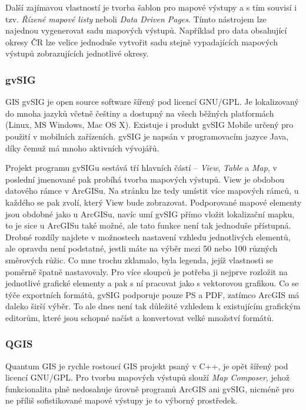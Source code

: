 \documentclass[a4paper,12pt,draft]{article}
\begin{document}
Další zajímavou vlastností je tvorba šablon pro mapové výstupy a s tím souvisí i tzv. \emph{Řízené mapové listy} neboli \emph{Data Driven Pages}. Tímto nástrojem lze najednou vygenerovat sadu mapových výstupů. Například pro data obsahující okresy ČR lze velice jednoduše vytvořit sadu stejně vypadajících mapových výstupů zobrazujících jednotlivé okresy.


\subsubsection{gvSIG}
GIS gvSIG je open source software šířený pod licencí GNU/GPL. Je lokalizovaný do mnoha jazyků včetně češtiny a dostupný na všech běžných platformách (Linux, MS Windows, Mac OS X). Existuje i produkt gvSIG Mobile určený pro použití v mobilních zařízeních. gvSIG je napsán v programovacím jazyce Java, díky čemuž má mnoho aktivních vývojářů.

Projekt programu gvSIGu sestává tří hlavních částí -- \emph{View}, \emph{Table} a \emph{Map}, v poslední jmenované pak probíhá tvorba mapových výstupů. View je obdobou datového rámce v ArcGISu. Na stránku lze tedy umístit více mapových rámců, u každého se pak zvolí, který View bude zobrazovat. Podporované mapové elementy jsou obdobné jako u ArcGISu, navíc umí gvSIG přímo vložit lokalizační mapku, to je sice u ArcGISu také možné, ale tato funkce není tak jednoduše přístupná. Drobné rozdíly najdete v možnostech nastavení vzhledu jednotlivých elementů, ale opravdu není podstatné, jestli máte na výběr mezi 50 nebo 100 různých směrových růžic. Co mne trochu zklamalo, byla legenda, jejíž vlastnosti se poměrně špatně nastavovaly. Pro více sloupců je potřeba ji nejprve rozložit na jednotlivé grafické elementy a pak s ní pracovat jako s vektorovou grafikou. Co se týče exportních formátů, gvSIG podporuje pouze PS a PDF, zatímco ArcGIS má daleko širší výběr. To ale dnes není tak důležité vzhledem k existujícím grafickým editorům, které jsou schopné načíst a konvertovat velké množství formátů.

\subsubsection{QGIS}
Quantum GIS je rychle rostoucí GIS projekt psaný v C++, je opět šířený pod licencí GNU/GPL. Pro tvorbu mapových výstupů slouží \emph{Map Composer}, jehož funkcionalita plně nedosahuje úrovně programů ArcGIS ani gvSIG, nicméně pro ne příliš sofistikované mapové výstupy je to výborný prostředek.
\end{document}
